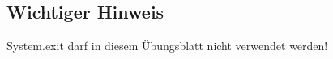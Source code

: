 \begin{tcolorbox}
\subsection*{Wichtiger Hinweis}
System.exit darf in diesem Übungsblatt nicht verwendet werden!
\end{tcolorbox}


